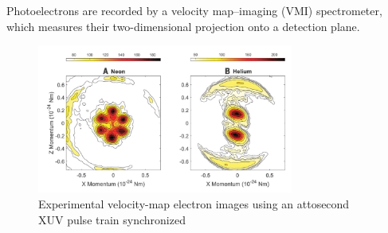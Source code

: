 Photoelectrons are recorded by a
velocity map–imaging (VMI) spectrometer, which
measures their two-dimensional projection
onto a detection plane. 

\begin{figure}[h]
    \centering
    \includegraphics[width=0.75\textwidth]{figures/4.png}
    \caption{Experimental
velocity-map electron images using an attosecond XUV pulse train
synchronized}
\end{figure}

